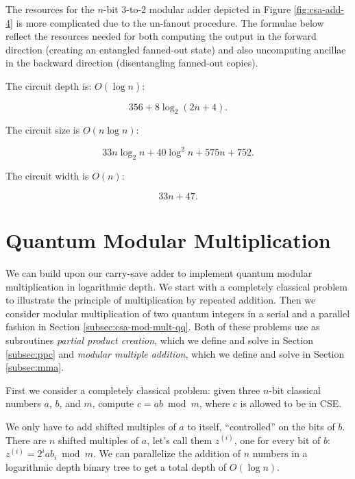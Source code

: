 \documentclass[twoside]{article}
\begin{document}
The resources for the $n$-bit $3$-to-$2$ modular adder depicted in Figure
\ref{fig:csa-add-4} is more complicated due to the un-fanout procedure.
The formulae below reflect the resources needed for both computing the output
in the forward direction (creating an entangled fanned-out state)
and also uncomputing ancillae in the backward
direction (disentangling fanned-out copies).

The circuit depth is: $O(\log n)$:

\begin{equation}
356 + 8\log_2(2n+4)\text{.}
\end{equation}

The circuit size is $O(n\log n)$:

\begin{equation}
33n\log_2 n + 40\log^2 n + 575n + 752\text{.}
\end{equation}

The circuit width is $O(n)$:

\begin{equation}
33n + 47\text{.}
\end{equation}

%
\section{Quantum Modular Multiplication}
\label{sec:csa-mod-mult}

We can build upon our carry-save adder to implement quantum modular
multiplication in logarithmic depth. We start with a completely classical
problem to illustrate the principle of multiplication by repeated addition.
Then we consider modular multiplication of two quantum integers in a serial
and a parallel fashion in Section
\ref{subsec:csa-mod-mult-qq}. Both of these problems use as subroutines
\emph{partial product creation}, which we define and solve
 in Section \ref{subsec:ppc} and
 \emph{modular multiple addition}, which we define and solve
in Section \ref{subsec:mma}.

First we consider a completely classical problem:
given three $n$-bit classical numbers $a$, $b$, and $m$,
compute $c = ab \bmod m$, where $c$ is allowed to be in CSE.

We only have to add shifted
multiples of $a$ to itself, ``controlled'' on the bits of $b$. There are
$n$ shifted multiples of $a$, let's call them $z^{(i)}$, one for every bit of $b$:
$z^{(i)} = 2^i a b_i \bmod m$.
We can parallelize the addition of $n$ numbers in a logarithmic depth
binary tree to get a total depth of $O(\log n)$.
\end{document}
